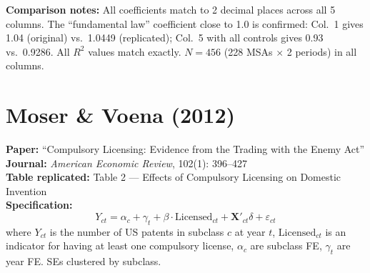 \documentclass[11pt,a4paper]{article}
\begin{document}
\vspace{1cm}
\textbf{Comparison notes:} All coefficients match to 2 decimal places across all 5 columns. The ``fundamental law'' coefficient close to 1.0 is confirmed: Col.\ 1 gives 1.04 (original) vs.\ 1.0449 (replicated); Col.\ 5 with all controls gives 0.93 vs.\ 0.9286. All $R^2$ values match exactly. $N = 456$ (228 MSAs $\times$ 2 periods) in all columns.

\newpage

\section{Moser \& Voena (2012)}

\textbf{Paper:} ``Compulsory Licensing: Evidence from the Trading with the Enemy Act''\\
\textbf{Journal:} \textit{American Economic Review}, 102(1): 396--427\\
\textbf{Table replicated:} Table 2 --- Effects of Compulsory Licensing on Domestic Invention\\
\textbf{Specification:}
\[
Y_{ct} = \alpha_c + \gamma_t + \beta \cdot \text{Licensed}_{ct} + \mathbf{X}'_{ct}\delta + \varepsilon_{ct}
\]
where $Y_{ct}$ is the number of US patents in subclass $c$ at year $t$, $\text{Licensed}_{ct}$ is an indicator for having at least one compulsory license, $\alpha_c$ are subclass FE, $\gamma_t$ are year FE. SEs clustered by subclass.

\vspace{0.3cm}
\noindent{}
\end{document}
